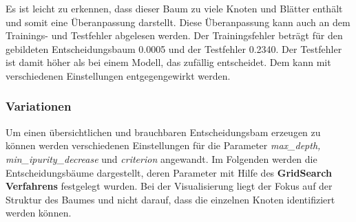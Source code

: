Es ist leicht zu erkennen, dass dieser Baum zu viele Knoten und Blätter enthält und somit eine Überanpassung darstellt. Diese Überanpassung kann auch an dem Trainings- und Testfehler abgelesen werden. Der Trainingsfehler beträgt für den gebildeten Entscheidungsbaum 0.0005 und der Testfehler 0.2340. Der Testfehler ist damit höher als bei einem Modell, das zufällig entscheidet. Dem kann mit verschiedenen Einstellungen entgegengewirkt werden.
\subsubsection{Variationen}
Um einen übersichtlichen und brauchbaren Entscheidungsbam erzeugen zu können werden verschiedenen Einstellungen für die Parameter \emph{max\_depth, min\_ipurity\_decrease} und \emph{criterion} angewandt. Im Folgenden werden die Entscheidungsbäume dargestellt, deren Parameter mit Hilfe des \textbf{GridSearch Verfahrens} festgelegt wurden. Bei der Visualisierung liegt der Fokus auf der Struktur des Baumes und nicht darauf, dass die einzelnen Knoten identifiziert werden können.\\
